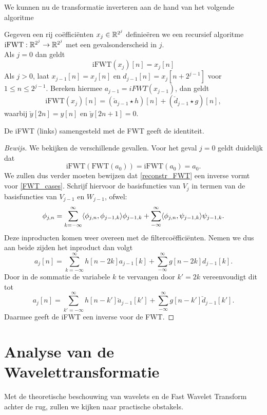 We kunnen nu de transformatie inverteren aan de hand van het volgende algoritme
\begin{algo}
  Gegeven een rij co\"effici\"enten $x_j\in\mathbb{R}^{2^j}$ definie\"eren we een recursief
  algoritme $\mathrm{iFWT}:\mathbb{R}^{2^j}\to\mathbb{R}^{2^j}$ met een gevalsonderscheid in $j$.\\
  Als $j=0$ dan geldt
  \[
  \mathrm{iFWT}(x_j)[n] = x_j[n]
  \]
  Als $j>0$, laat $x_{j-1}[n] = x_j[n]$ en $d_{j-1}[n] = x_j[n+2^{j-1}]$ voor $1\leq n\leq 2^{j-1}$. 
  Bereken hiermee $a_{j-1} = iFWT(x_{j-1})$,
  dan geldt
  \begin{equation}
    \label{reconstr_FWT}
    \mathrm{iFWT}(x_j)[n] = (\breve a_{j-1}\star h)[n] + (\breve d_{j-1}\star g)[n],
  \end{equation}
  waarbij $\breve y [2n] = y[n]$ en $\breve y [2n+1] = 0$.
\end{algo}
\begin{stelling}
  De iFWT (links) samengesteld met de FWT geeft de identiteit.
\end{stelling}
\begin{proof}[Bewijs]
  We bekijken de verschillende gevallen. Voor het geval $j=0$ geldt duidelijk dat
  \[
  \mathrm{iFWT}(\mathrm{FWT}(a_0)) = \mathrm{iFWT}(a_0) = a_0.
  \]
  We zullen dus verder moeten bewijzen dat \eqref{reconstr_FWT} een inverse vormt voor
  \eqref{FWT_cases}.
  Schrijf hiervoor de basisfuncties van $V_j$ in termen van de basisfuncties van $V_{j-1}$
  en $W_{j-1}$, ofwel:
  \[
  \phi_{j,n} = \sum_{k=-\infty}^\infty \langle \phi_{j,n} , \phi_{j-1,k} \rangle\phi_{j-1,k}
  + \sum_{-\infty}^\infty \langle \phi_{j,n} , \psi_{j-1,k} \rangle\psi_{j-1,k}.
  \]
  Deze inproducten komen weer overeen met de filterco\"effici\"enten. Nemen we dus aan
  beide zijden het inproduct dan volgt
  \[
  a_j[n] = \sum_{k=-\infty}^\infty h[n-2k]a_{j-1}[k]
  + \sum_{-\infty}^\infty g[n-2k]d_{j-1}[k].
  \]
  Door in de sommatie de variabele $k$ te vervangen door $k'=2k$ vereenvoudigt dit tot
  \[
  a_j[n] = \sum_{k'=-\infty}^\infty h[n-k']\breve a_{j-1}[k']
  + \sum_{-\infty}^\infty g[n-k']\breve d_{j-1}[k'].
  \]
  Daarmee geeft de iFWT een inverse voor de FWT.
\end{proof}

\section{Analyse van de Wavelettransformatie}
Met de theoretische beschouwing van wavelets en de Fast Wavelet Transform achter de rug, 
zullen we kijken naar practische obstakels.


